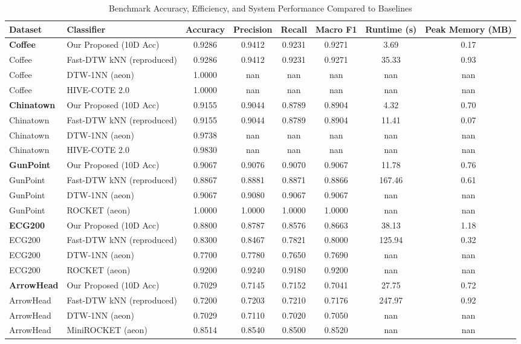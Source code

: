 \documentclass[conference]{IEEEtran}
\begin{document}
\begin{table}[htbp]
\caption{Benchmark Accuracy, Efficiency, and System Performance Compared to Baselines}
\label{tab:benchmark_metrics}
\centering
\begin{tabular}{|l|l|c|c|c|c|c|c|}
\hline
Dataset & Classifier & Accuracy & Precision & Recall & Macro F1 & Runtime (s) & Peak Memory (MB) \\ \hline
\textbf{Coffee} & Our Proposed (10D Acc) & 0.9286 & 0.9412 & 0.9231 & 0.9271 & 3.69 & 0.17 \\ 
Coffee & Fast-DTW kNN (reproduced) & 0.9286 & 0.9412 & 0.9231 & 0.9271 & 35.33 & 0.93 \\ 
Coffee & DTW-1NN (aeon) & 1.0000 & nan & nan & nan & nan & nan \\ 
Coffee & HIVE-COTE 2.0 & 1.0000 & nan & nan & nan & nan & nan \\ \hline
\textbf{Chinatown} & Our Proposed (10D Acc) & 0.9155 & 0.9044 & 0.8789 & 0.8904 & 4.32 & 0.70 \\ 
Chinatown & Fast-DTW kNN (reproduced) & 0.9155 & 0.9044 & 0.8789 & 0.8904 & 11.41 & 0.07 \\ 
Chinatown & DTW-1NN (aeon) & 0.9738 & nan & nan & nan & nan & nan \\ 
Chinatown & HIVE-COTE 2.0 & 0.9830 & nan & nan & nan & nan & nan \\ \hline
\textbf{GunPoint} & Our Proposed (10D Acc) & 0.9067 & 0.9076 & 0.9070 & 0.9067 & 11.78 & 0.76 \\ 
GunPoint & Fast-DTW kNN (reproduced) & 0.8867 & 0.8881 & 0.8871 & 0.8866 & 167.46 & 0.61 \\ 
GunPoint & DTW-1NN (aeon) & 0.9067 & 0.9080 & 0.9067 & 0.9067 & nan & nan \\ 
GunPoint & ROCKET (aeon) & 1.0000 & 1.0000 & 1.0000 & 1.0000 & nan & nan \\ \hline
\textbf{ECG200} & Our Proposed (10D Acc) & 0.8800 & 0.8787 & 0.8576 & 0.8663 & 38.13 & 1.18 \\ 
ECG200 & Fast-DTW kNN (reproduced) & 0.8300 & 0.8467 & 0.7821 & 0.8000 & 125.94 & 0.32 \\ 
ECG200 & DTW-1NN (aeon) & 0.7700 & 0.7780 & 0.7650 & 0.7690 & nan & nan \\ 
ECG200 & ROCKET (aeon) & 0.9200 & 0.9240 & 0.9180 & 0.9200 & nan & nan \\ \hline
\textbf{ArrowHead} & Our Proposed (10D Acc) & 0.7029 & 0.7145 & 0.7152 & 0.7041 & 27.75 & 0.72 \\ 
ArrowHead & Fast-DTW kNN (reproduced) & 0.7200 & 0.7203 & 0.7210 & 0.7176 & 247.97 & 0.92 \\ 
ArrowHead & DTW-1NN (aeon) & 0.7029 & 0.7110 & 0.7020 & 0.7050 & nan & nan \\ 
ArrowHead & MiniROCKET (aeon) & 0.8514 & 0.8540 & 0.8500 & 0.8520 & nan & nan \\ \hline
\end{tabular}
\end{table}
\end{document}
